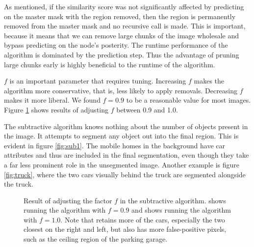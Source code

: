 \documentclass[10pt,twocolumn,letterpaper]{article}
\begin{document}
As mentioned, if the similarity score was not significantly affected by
predicting on the master mask with the region removed, then the region is
permanently removed from the master mask
and no recursive call is made.  This is important, because it means
that we can remove large chunks of the image wholesale and bypass predicting
on the node's posterity.
The runtime performance of the algorithm is dominated by the prediction step.
Thus the advantage of pruning large chunks early is highly beneficial to
the runtime of the algorithm.

$f$ is an important parameter that requires tuning.  Increasing $f$ makes the
algorithm more conservative, that is, less likely to apply removals.  Decreasing
$f$ makes it more liberal.  We found $f=0.9$ to be a reasonable value for most images.
Figure \ref{fig:f} shows results of adjusting $f$ between 0.9 and 1.0.

The subtractive algorithm knows nothing about the number of objects present
in the image.  It attempts to segment any object out into the final region.
This is evident in figure \ref{fig:sub1}.  The mobile homes in the background
have car attributes and thus are included in the final segmentation, even
though they take a far less prominent role in the unsegmented image.  Another
example is figure \ref{fig:truck}, where the two cars visually behind the truck
are segmented alongside the truck.

\begin{figure}
\centering
{}
 \caption{Result of adjusting the factor $f$ in the subtractive
algorithm.  shows running the algorithm with $f=0.9$
and  shows running the algorithm with $f=1.0$.  Note
that  retains more of the cars, especially the two
closest on the right and left, but also has more false-positive
pixels, such as the ceiling region of the parking garage.}
\label{fig:f}
\end{figure}
\end{document}
